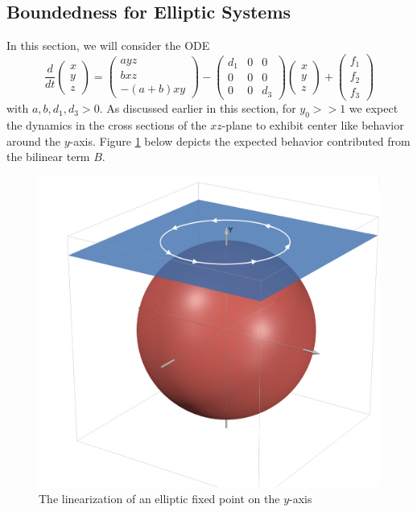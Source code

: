 \documentclass[11pt]{article}
\begin{document}
\subsection{Boundedness for Elliptic Systems}

In this section, we will consider the ODE\begin{equation}\label{eq:elliptic2}
    \frac{d}{dt} \begin{pmatrix} x \\ y \\ z 
    \end{pmatrix} = \begin{pmatrix}
        ayz\\
        bxz\\
        -(a+b)xy
    \end{pmatrix} - \begin{pmatrix}
        d_1 & 0 & 0 \\
        0 & 0 & 0 \\ 
        0 & 0 & d_3 
    \end{pmatrix} \begin{pmatrix} x \\ y \\ z 
    \end{pmatrix} 
    + 
    \begin{pmatrix} f_1 \\ f_2 \\ f_3
    \end{pmatrix}
\end{equation}with $a, b, d_1, d_3 > 0$. As discussed earlier in this section, for $y_0>>1$ we expect the dynamics in the cross sections of the $xz$-plane to exhibit center like behavior around the $y$-axis. Figure \ref{fig:parab} below depicts the expected behavior contributed from the bilinear term $B$.
\begin{figure}[h!]
    \centering
    \includegraphics[width=0.4\linewidth]{parab.png}
    \caption{The linearization of an elliptic fixed point on the $y$-axis}
    \label{fig:parab}
\end{figure}
\end{document}
